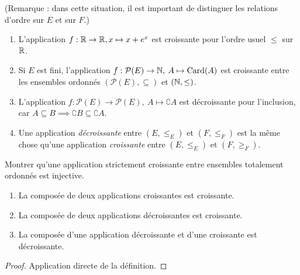 (Remarque : dans cette situation, il est important de distinguer les relations d'ordre sur $E$ et sur $F$.)

\begin{exemple}
\begin{enumerate}
\item L'application $f : \mathbb{R}\to \mathbb{R}, x\mapsto x+e^x$ est croissante pour l'ordre usuel $\leq $ sur $\mathbb{R}$.
\item Si $E$ est fini, l'application $f : \mathcal P(E) \to \mathbb{N}, \: A\mapsto \operatorname{Card}(A)$ est croissante entre les ensembles ordonnés $(\mathcal P(E), \subseteq)$ et $(\mathbb{N}, \leq)$.
\item L'application $f : \mathcal P(E) \to \mathcal P(E), \: A\mapsto \complement A$ est décroissante pour l'inclusion, car $A\subseteq B \implies \complement B\subseteq \complement A$.
\item Une application \emph{décroissante} entre $(E,\leq_E)$ et $(F,\leq_F)$ est la même chose qu'une application \emph{croissante} entre $(E,\leq_E)$ et $(F,\geq_F)$.
\end{enumerate}
\end{exemple}

\begin{exercice}
Montrer qu'une application strictement croissante entre ensembles totalement ordonnés est injective.
\end{exercice}


\begin{proposition}
\begin{enumerate}
\item La composée de deux applications croissantes est croissante.
\item La composée de deux applications décroissantes est croissante.
\item La composée d'une application décroissante et d'une croissante est décroissante.
\end{enumerate}
\end{proposition}

\begin{proof}
Application directe de la définition.
\end{proof}


